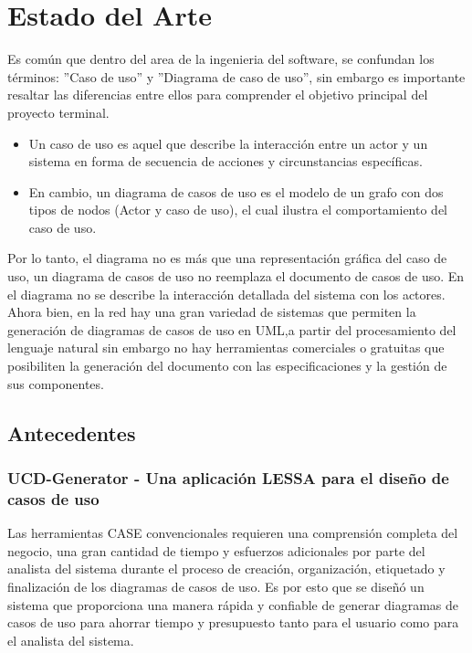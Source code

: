 \chapter{Estado del Arte}


	Es común que dentro del area de la ingenieria del software, se confundan los términos: ''Caso de uso'' y ''Diagrama de caso de uso'', sin embargo es importante resaltar las diferencias entre ellos para comprender el objetivo principal del proyecto terminal.
	
	 \begin{itemize}
		\item Un caso de uso es aquel que describe la interacción entre un actor y un sistema en forma de secuencia de acciones y circunstancias específicas.
		
		\item En cambio, un diagrama de casos de uso es el modelo de un grafo con dos tipos de nodos (Actor y caso de uso), el cual ilustra el comportamiento del caso de uso.
	\end{itemize}

	Por lo tanto, el diagrama no es más que una representación gráfica del caso de uso, un diagrama de casos de uso no  reemplaza el documento de casos de uso. En el diagrama no se describe la interacción detallada del sistema con los actores.\\
	

	Ahora bien, en la red hay una gran variedad de sistemas que permiten la generación de diagramas de casos de uso en UML,a partir del procesamiento del lenguaje natural sin embargo no hay herramientas comerciales o gratuitas que posibiliten la generación del documento con las especificaciones y la gestión de sus componentes.
	

\section{Antecedentes}

\subsection{UCD-Generator - Una aplicación LESSA para el diseño de casos de uso}

Las herramientas CASE convencionales requieren una comprensión completa del negocio, una gran cantidad de tiempo y esfuerzos adicionales por parte del analista del sistema durante el proceso de creación, organización, etiquetado y finalización de los diagramas de casos de uso. Es por esto que se diseñó un sistema que proporciona una manera rápida y confiable de generar diagramas de casos de uso para ahorrar tiempo y presupuesto tanto para el usuario como para el analista del sistema.

